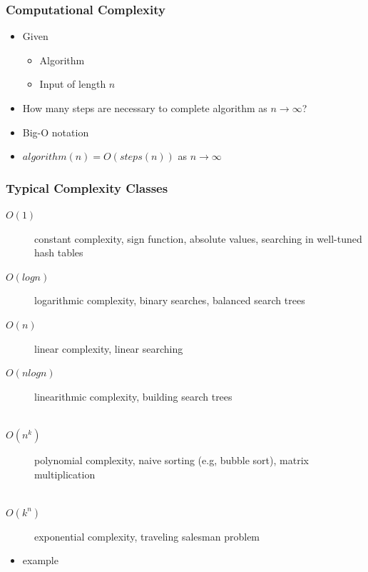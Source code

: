 \begin{frame}
 \frametitle{Computational Complexity}
 \begin{itemize}
  \item Given
   \begin{itemize}
    \item Algorithm
    \item Input of length \( n \)
   \end{itemize}
  \item How many steps are necessary to complete algorithm as \( n \rightarrow \infty \)?
 \end{itemize}
 \begin{itemize}
  \item Big-O notation
  \item \( algorithm(n) = O(steps(n)) \) as \(n \rightarrow \infty \)
 \end{itemize}
\end{frame}

\begin{frame}
 \frametitle{Typical Complexity Classes}
 \begin{description}
  \item[\(O(1)\)] constant complexity, sign function, absolute values, searching in well-tuned hash tables
  \item[\(O(logn)\)] logarithmic complexity, binary searches, balanced search trees
  \item[\(O(n)\)] linear complexity, linear searching
  \item[\(O(nlogn)\)] linearithmic complexity, building search trees \\ \hfill \\
  \item[\(O(n^k)\)] polynomial complexity, naive sorting (e.g, bubble sort), matrix multiplication \\ \hfill \\
  \item[\(O(k^n)\)] exponential complexity, traveling salesman problem
 \end{description}
 \begin{itemize}
  \item example 
 \end{itemize}
\end{frame}

